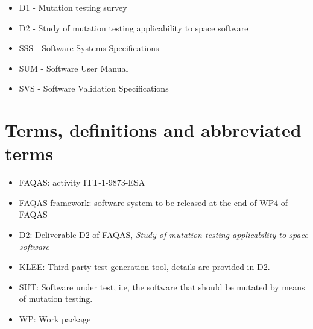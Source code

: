 \begin{itemize}
\item{D1 - Mutation testing survey}
\item{D2 - Study of mutation testing applicability to space software}
\item{SSS - Software Systems Specifications}
\item{SUM - Software User Manual}
\item{SVS - Software Validation Specifications}
\end{itemize}

\chapter{Terms, definitions and abbreviated terms}

\begin{itemize}
\item{FAQAS}: activity ITT-1-9873-ESA
\item{FAQAS-framework}: software system to be released at the end of WP4 of FAQAS
\item{D2}: Deliverable D2 of FAQAS, \emph{Study of mutation testing applicability to space software}
\item{KLEE}: Third party test generation tool, details are provided in D2.
\item{SUT}: Software under test, i.e, the software that should be mutated by means of mutation testing.
\item{WP}: Work package
\end{itemize}

\clearpage

